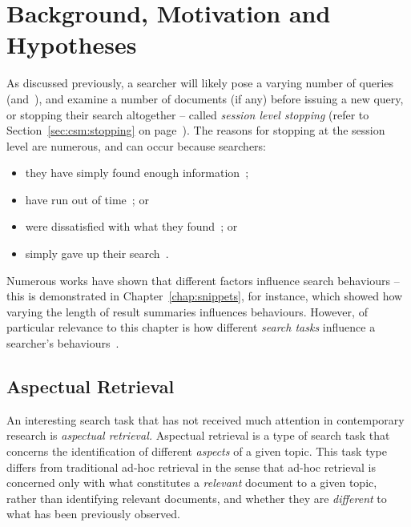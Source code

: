 \section{Background, Motivation and Hypotheses}\label{sec:diversity:background}
As discussed previously, a searcher will likely pose a varying number of queries (and~), and examine a number of documents (if any) before issuing a new query, or stopping their search altogether -- called \emph{session level stopping} (refer to Section~\ref{sec:csm:stopping} on page~\pageref{sec:csm:stopping}). The reasons for stopping at the session level are numerous, and can occur because searchers:

\begin{itemize}
    \item{they have simply found enough information~\citep{prabha2007enough, dostert2009satisficing, hassan2013beyond_clicks};}
    \item{have run out of time~\citep{zach2005enough_is_enough}; or}
    \item{were dissatisfied with what they found~\citep{kiseleva2015serp_fails}; or}
    \item{simply gave up their search~\citep{diriye2012abandonment}.}
\end{itemize}

Numerous works have shown that different factors influence search behaviours -- this is demonstrated in Chapter~\ref{chap:snippets}, for instance, which showed how varying the length of result summaries influences behaviours. However, of particular relevance to this chapter is how different \emph{search tasks} influence a searcher's behaviours~\citep{kelly2015search_tasks}.

\subsection{Aspectual Retrieval}
An interesting search task that has not received much attention in contemporary research is \emph{aspectual retrieval.} Aspectual retrieval is a type of search task that concerns the identification of different \emph{aspects} of a given topic. This task type differs from traditional ad-hoc retrieval in the sense that ad-hoc retrieval is concerned only with what constitutes a \emph{relevant} document to a given topic, rather than identifying relevant documents, and whether they are \emph{different} to what has been previously observed.

